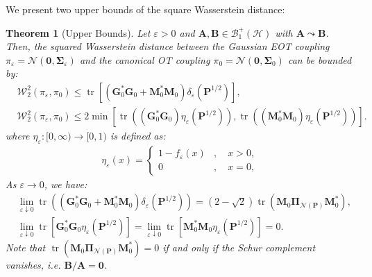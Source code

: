 \documentclass[noinfoline]{imsart}\setcounter{tocdepth}{2}
\newcommand{\m}[1]{\mathbf{#1}}
\renewcommand{\c}[1]{\mathcal{#1}}
\DeclareMathOperator{\tr}{tr}
\theoremstyle{plain}
\newtheorem{theorem}{Theorem}[section]
\begin{document}
We present two upper bounds of the square Wasserstein distance:
\begin{theorem}[Upper Bounds]\label{thm:upper:bdds}
Let $\varepsilon > 0$ and $\m{A}, \m{B} \in \c{B}_{1}^{+}(\c{H})$ with $\m{A} \leadsto \m{B}$. Then, the squared Wasserstein distance between the Gaussian EOT coupling $\pi_{\varepsilon} = \c{N}(\m{0}, \m{\Sigma}_{\varepsilon})$ and the canonical OT coupling $\pi_{0} = \c{N}(\m{0}, \m{\Sigma}_{0})$ can be bounded by:
\begin{align}
    &\c{W}_{2}^{2}(\pi_{\varepsilon}, \pi_{0}) \le \tr \left[(\m{G}_{0}^{*} \m{G}_{0} + \m{M}_{0}^{*} \m{M}_{0}) \delta_{\varepsilon}(\m{P}^{1/2}) \right], \label{eq:W2:pert:bdd1} \\
    &\c{W}_{2}^{2}(\pi_{\varepsilon}, \pi_{0}) \le 2 \min \left[ \tr \left((\m{G}_{0}^{*} \m{G}_{0}) \eta_{\varepsilon}(\m{P}^{1/2}) \right), \tr \left((\m{M}_{0}^{*} \m{M}_{0}) \eta_{\varepsilon}(\m{P}^{1/2}) \right) \right]. \label{eq:W2:pert:bdd2}
\end{align}
where $\eta_{\varepsilon} : [0, \infty) \to [0, 1)$ is defined as:
\begin{align*}
    \eta_{\varepsilon}(x) = \begin{cases}
        1-f_{\varepsilon}(x) &, \quad x>0, \\
        0 &, \quad x=0,
    \end{cases}
\end{align*}
As $\varepsilon \to 0$, we have:
\begin{align*}
    &\lim_{\varepsilon \downarrow 0} \tr \left((\m{G}_{0}^{*} \m{G}_{0} + \m{M}_{0}^{*} \m{M}_{0}) \delta_{\varepsilon}(\m{P}^{1/2}) \right) = (2-\sqrt{2}) \tr (\m{M}_{0} \m{\Pi}_{\c{N}(\m{P})} \m{M}_{0}^{*}), \\
    &\lim_{\varepsilon \downarrow 0} \tr \left[ \m{G}_{0}^{*} \m{G}_{0} \eta_{\varepsilon} (\m{P}^{1/2}) \right] = \lim_{\varepsilon \downarrow 0} \tr \left[ \m{M}_{0}^{*} \m{M}_{0} \eta_{\varepsilon} (\m{P}^{1/2}) \right] = 0.
\end{align*}
Note that $\tr (\m{M}_{0} \m{\Pi}_{\c{N}(\m{P})} \m{M}_{0}^{*}) = 0$ if and only if the Schur complement vanishes, i.e. $\m{B}/\m{A} = \m{0}$.
\end{theorem}
\end{document}
